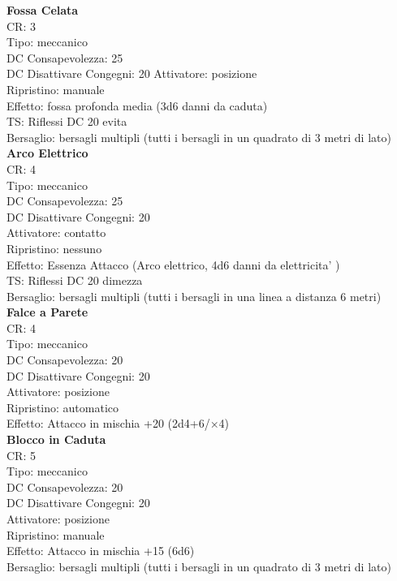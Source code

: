 \documentclass[a4paper,11pt,twoside,openany]{book}
\begin{document}
\begin{multicols}{2}
\textbf{Fossa Celata}\\
CR: 3 \\
Tipo: meccanico \\
DC Consapevolezza: 25 \\
DC Disattivare Congegni: 20 
Attivatore: posizione \\
Ripristino: manuale \\
Effetto: fossa profonda media (3d6 danni da caduta) \\
TS: Riflessi DC 20 evita \\
Bersaglio: bersagli multipli (tutti i bersagli in un quadrato di 3 metri di lato)\\

\textbf{Arco Elettrico}\\
CR: 4 \\
Tipo: meccanico \\
DC Consapevolezza: 25 \\
DC Disattivare Congegni: 20 \\
Attivatore: contatto \\
Ripristino: nessuno \\
Effetto: Essenza Attacco (Arco elettrico, 4d6 danni da elettricita' )\\
TS: Riflessi DC 20 dimezza \\
Bersaglio: bersagli multipli (tutti i bersagli in una linea a distanza 6 metri)\\

\textbf{Falce a Parete}\\
CR: 4 \\
Tipo: meccanico \\
DC Consapevolezza: 20 \\
DC Disattivare Congegni: 20 \\
Attivatore: posizione \\
Ripristino: automatico \\
Effetto: Attacco in mischia +20 (2d4+6/×4)\\

\textbf{Blocco in Caduta}\\
CR: 5 \\
Tipo: meccanico \\
DC Consapevolezza: 20 \\
DC Disattivare Congegni: 20 \\
Attivatore: posizione \\
Ripristino: manuale \\
Effetto: Attacco in mischia +15 (6d6) \\
Bersaglio: bersagli multipli (tutti i bersagli in un quadrato di 3 metri di lato)\\


\end{multicols}
\end{document}
